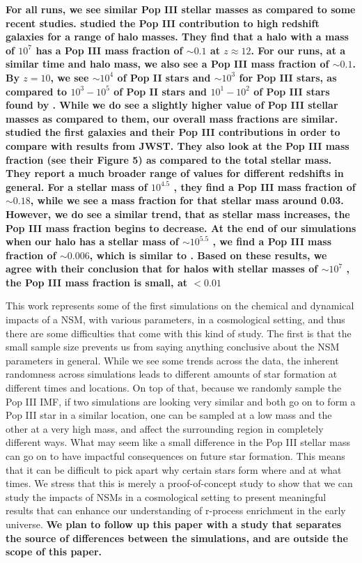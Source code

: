 \documentclass[fleqn,usenatbib]{mnras}
\begin{document}
\textbf{For all runs, we see similar Pop III stellar masses as compared to some recent studies. \citet{Riaz22} studied the Pop III contribution to high redshift galaxies for a range of halo masses. They find that a halo with a mass of $10^7$ \Ms{} has a Pop III mass fraction of $\sim 0.1$ at $z \approx 12$. For our runs, at a similar time and halo mass, we also see a Pop III mass fraction of $\sim 0.1$. By $z = 10$, we see $\sim 10^{4}$ \Ms{} of Pop II stars and $\sim 10^{3}$ \Ms{} for Pop III stars, as compared to $10^3 - 10^5$ \Ms{} of Pop II stars and  $10^1 - 10^2$ \Ms{} of Pop III stars found by \citet{Riaz22}. While we do see a slightly higher value of Pop III stellar masses as compared to them, our overall mass fractions are similar. \citet{Yajima23} studied the first galaxies and their Pop III contributions in order to compare with results from JWST. They also look at the Pop III mass fraction (see their Figure 5) as compared to the total stellar mass. They report a much broader range of values for different redshifts in general. For a stellar mass of $10^{4.5}$ \Ms, they find a Pop III mass fraction of $\sim 0.18$, while we see a mass fraction for that stellar mass around 0.03. However, we do see a similar trend, that as stellar mass increases, the Pop III mass fraction begins to decrease. At the end of our simulations when our halo has a stellar mass of $\sim 10^{5.5}$ \Ms, we find a Pop III mass fraction of $\sim 0.006$, which is similar to \citet{Yajima23}. Based on these results, we agree with their conclusion that for halos with stellar masses of $\sim 10^{7}$ \Ms, the Pop III mass fraction is small, at $< 0.01$ }

This work represents some of the first simulations on the chemical and dynamical impacts of a NSM, with various parameters, in a cosmological setting, and thus there are some difficulties that come with this kind of study. The first is that the small sample size prevents us from saying anything conclusive about the NSM parameters in general. While we see some trends across the data, the inherent randomness across simulations leads to different amounts of star formation at different times and locations. On top of that, because we randomly sample the Pop III IMF, if two simulations are looking very similar and both go on to form a Pop III star in a similar location, one can be sampled at a low mass and the other at a very high mass, and affect the surrounding region in completely different ways. What may seem like a small difference in the Pop III stellar mass can go on to have impactful consequences on future star formation. This means that it can be difficult to pick apart why certain stars form where and at what times. We stress that this is merely a proof-of-concept study to show that we can study the impacts of NSMs in a cosmological setting to present meaningful results that can enhance our understanding of r-process enrichment in the early universe. \textbf{We plan to follow up this paper with a study that separates the source of differences between the simulations, and are outside the scope of this paper.}
\end{document}
